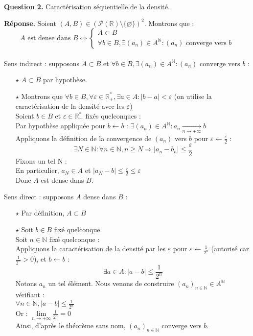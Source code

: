 \documentclass{article}
\newcommand{\N}{\ensuremath{\mathbb N} }
\newcommand{\R}{\ensuremath{\mathbb R} }
\begin{document}
\flushleft
\textbf{Question 2.} Caractérisation séquentielle de la densité.
\newline

\textbf{Réponse. } $\text{Soient } (A,B) \in (\mathcal{P}(\R) \setminus \{\varnothing\})^{2}$. Montrons que :
\\
$$A \text{ est dense dans } B \iff \left\{ \begin{array}{l}
    A \subset B \\
    \forall b \in B, \exists(a_{n}) \in A^{\N} : (a_{n}) \text{ converge vers }b
\end{array}\right. $$
\\
Sens indirect : supposons $A \subset B$ et $\forall b \in B, \exists(a_{n}) \in A^{\N} : (a_{n}) \text{ converge vers }b$ :\\
\begin{itemize}
    \item[$\star$] $A \subset B$ par hypothèse.
    \item[$\star$] Montrons que $\forall b \in B, \forall \varepsilon \in \R^{*}_{+}, \exists a \in A : |b - a| < \varepsilon$ (on utilise la caractérisation de la densité avec les $\varepsilon$) \\
    Soient $b \in B$ et $\varepsilon \in \R^{*}_{+}$ fixés quelconques : \\
    Par hypothèse appliquée pour $b \leftarrow b$ : $\exists(a_{n}) \in A^{\N} : a_{n} \underset{n \to +\infty}{\longrightarrow}b$ \\
    Appliquons la définition de la convergence de $(a_{n})$ vers $b$ pour $\varepsilon \leftarrow \frac{\varepsilon}{2}$ : \\
    $$\exists N \in \N : \forall n \in \N, n \geqslant N \Rightarrow |a_{n} - b_{n}| \leqslant \frac{\varepsilon}{2}$$
    Fixons un tel N : \\
    En particulier, $a_{N} \in A$ et $|a_{N} - b| \leqslant \frac{\varepsilon}{2} \leqslant \varepsilon$ \\
    Donc $A$ est dense dans $B$.
\end{itemize}

Sens direct : supposons $A$ dense dans $B$ : \\
\begin{itemize}
    \item[$\star$] Par définition, $A \subset B$
    \item[$\star$] Soit $b \in B$ fixé quelconque. \\
    Soit $n \in \N$ fixé quelconque :  \\
    Appliquons la caractérisation de la densité par les $\varepsilon$ pour $\varepsilon \leftarrow \frac{1}{2^{n}}$ (autorisé car $\frac{1}{2^{n}} > 0$), et $b \leftarrow b$ : 
    $$\exists a \in A : |a - b| \leqslant \frac{1}{2^{n}}$$
    Notons $a_{n}$ un tel élément. Nous venons de construire $(a_{n})_{n \in \N} \in A^{\N}$ vérifiant : \\
    $\forall n \in \N, |a - b| \leqslant \frac{1}{2^{n}}$ \\
    Or : $\underset{n \to +\infty}{\lim} \frac{1}{2^{n}} = 0$ \\
    Ainsi, d'après le théorème sans nom, $(a_{n})_{n \in \N}$ converge vers $b$.
\end{itemize}
\end{document}
